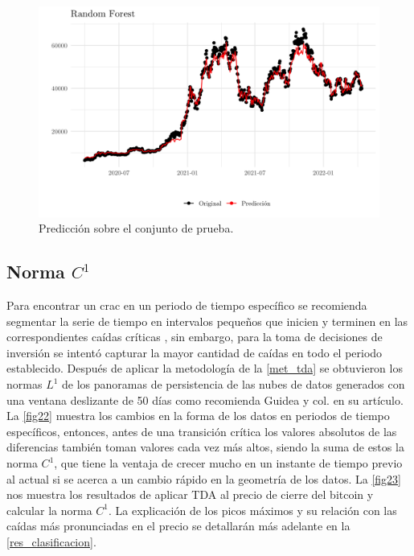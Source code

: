 \begin{figure}
	\centering
	\includegraphics[scale=0.35]{Chapter5/pred_RF.png}
	\caption{Predicción sobre el conjunto de prueba.}
	\label{fig21}
\end{figure}

\subsection{Norma $C^1$}

Para encontrar un crac en un periodo de tiempo específico se recomienda segmentar la serie de tiempo en intervalos pequeños que inicien y terminen en las correspondientes caídas críticas \parencite{gideaTopologicalRecognitionCritical2020}, sin embargo, para la toma de decisiones de inversión se intentó capturar la mayor cantidad de caídas en todo el periodo establecido. Después de aplicar la metodología de la \cref{met_tda} se obtuvieron los normas $L^1$ de los panoramas de persistencia de las nubes de datos generados con una ventana deslizante de 50 días como recomienda Guidea y col. \parencite*{gideaTopologicalRecognitionCritical2020} en su artículo. La \cref{fig22} muestra los cambios en la forma de los datos en periodos de tiempo específicos, entonces, antes de una transición crítica los valores absolutos de las diferencias también toman valores cada vez más altos, siendo la suma de estos la norma $C^1$, que tiene la ventaja de crecer mucho en un instante de tiempo previo al actual si se acerca a un cambio rápido en la geometría de los datos. La \cref{fig23} nos muestra los resultados de aplicar TDA al precio de cierre del bitcoin y calcular la norma $C^1$. La explicación de los picos máximos y su relación con las caídas más pronunciadas en el precio se detallarán más adelante en la \cref{res_clasificacion}.

